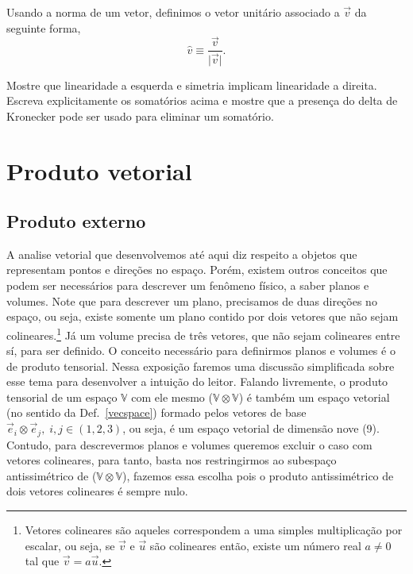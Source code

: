 Usando a norma de um vetor, definimos o vetor unitário associado a $\vec{v}$ da
seguinte forma,
\begin{equation}
	\hat{v} \equiv \frac{\vec{v}}{\vert\vec{v}\vert}.
\end{equation}

\begin{Exercise}[title={Produto interno}]
	\vspace{-\baselineskip}%
	\Question Mostre que linearidade a esquerda e simetria implicam linearidade
	a direita.
	\Question Escreva explicitamente os somatórios acima e mostre que a
	presença do delta de Kronecker pode ser usado para eliminar um somatório.
\end{Exercise}

\section{Produto vetorial}
\subsection{Produto externo}
\label{sec:eprod}

A analise vetorial que desenvolvemos até aqui diz respeito a objetos que
representam pontos e direções no espaço. Porém, existem outros conceitos que
podem ser necessários para descrever um fenômeno físico, a saber planos e
volumes. Note que para descrever um plano, precisamos de duas direções no
espaço, ou seja, existe somente um plano contido por dois vetores que não sejam
colineares.\footnote{Vetores colineares são aqueles correspondem a uma simples
	multiplicação por escalar, ou seja, se $\vec{v}$ e $\vec{u}$ são colineares
	então, existe um número real $a \neq 0$ tal que $\vec{v}=a\vec{u}$.} Já um
volume precisa de três vetores, que não sejam colineares entre sí, para ser
definido. O conceito necessário para definirmos planos e volumes é o de produto
tensorial. Nessa exposição faremos uma discussão simplificada sobre esse tema
para desenvolver a intuição do leitor. Falando livremente, o produto tensorial
de um espaço $\mathbb{V}$ com ele mesmo ($\mathbb{V}\otimes\mathbb{V}$) é também
um espaço vetorial (no sentido da Def.~\ref{vecspace}) formado pelos vetores de
base $\vec{e}_i\otimes \vec{e}_j,\;i,j\in (1,2,3)$, ou seja, é um espaço
vetorial de dimensão nove (9). Contudo, para descrevermos planos e volumes
queremos excluir o caso com vetores colineares, para tanto, basta nos
restringirmos ao subespaço antissimétrico de ($\mathbb{V}\otimes\mathbb{V}$),
fazemos essa escolha pois o produto antissimétrico de dois vetores colineares é
sempre nulo.

